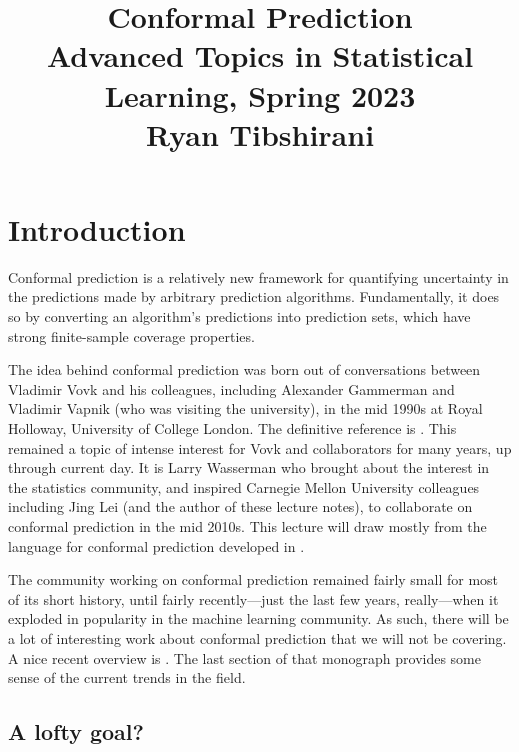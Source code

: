 \documentclass{article}
\title{Conformal Prediction \\ \smallskip
\large Advanced Topics in Statistical Learning, Spring 2023 \\ \smallskip
Ryan Tibshirani }
\date{}
\begin{document}
\maketitle
\RaggedRight
\vspace{-50pt}

\section{Introduction}

Conformal prediction is a relatively new framework for quantifying uncertainty
in the predictions made by arbitrary prediction algorithms. Fundamentally, it
does so by converting an algorithm's predictions into prediction sets, which
have strong finite-sample coverage properties. 

The idea behind conformal prediction was born out of conversations between
Vladimir Vovk and his colleagues, including Alexander Gammerman and Vladimir
Vapnik (who was visiting the university), in the mid 1990s at Royal Holloway,
University of College London. The definitive reference is
\citet{vovk2005algorithmic}. This remained a topic of intense interest for Vovk
and collaborators for many years, up through current day. It is Larry Wasserman
who brought about the interest in the statistics community, and inspired
Carnegie Mellon University colleagues including Jing Lei (and the author of
these lecture notes), to collaborate on conformal prediction in the mid
2010s. This lecture will draw mostly from the language for conformal prediction
developed in \citet{lei2018distribution, tibshirani2019conformal}.    

The community working on conformal prediction remained fairly small for most of
its short history, until fairly recently---just the last few years,
really---when it exploded in popularity in the machine learning community. As
such, there will be a lot of interesting work about conformal prediction that
we will not be covering. A nice recent overview is
\citet{angelopoulos2023gentle}. The last section of that monograph provides some 
sense of the current trends in the field.      

\subsection{A lofty goal?}

\def\hC{\hat{C}}
\def\hq{\hat{q}}
\def\Quantile{\mathrm{Quantile}}
\end{document}
